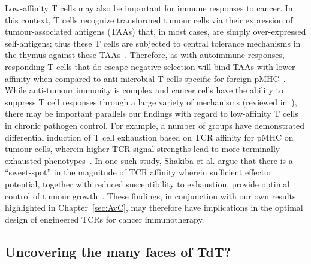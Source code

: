 Low-affinity T cells may also be important for immune responses to cancer. In this context, T cells recognize transformed tumour cells via their expression of tumour-associated antigens (TAAs) that, in most cases, are simply over-expressed self-antigens; thus these T cells are subjected to central tolerance mechanisms in the thymus against these TAAs~\cite{mcmahan2007mobilizing,martinez2018pd}. Therefore, as with autoimmune responses, responding T cells that do escape negative selection will bind TAAs with lower affinity when compared to anti-microbial T cells specific for foreign pMHC~\cite{mcmahan2007mobilizing}. While anti-tumour immunity is complex and cancer cells have the ability to suppress T cell responses through a large variety of mechanisms (reviewed in~\cite{kim2022evasion}), there may be important parallels our findings with regard to low-affinity T cells in chronic pathogen control. For example, a number of groups have demonstrated differential induction of T cell exhaustion based on TCR affinity for pMHC on tumour cells, wherein higher TCR signal strengths lead to more terminally exhausted phenotypes~\cite{martinez2018pd,shakiba2021tcr,hay2023low}. In one such study, Shakiba et al. argue that there is a ``sweet-spot'' in the magnitude of TCR affinity wherein sufficient effector potential, together with reduced susceptibility to exhaustion, provide optimal control of tumour growth~\cite{shakiba2021tcr}. These findings, in conjunction with our own results highlighted in Chapter~\ref{sec:AvC}, may therefore have implications in the optimal design of engineered TCRs for cancer immunotherapy.


\subsection{Uncovering the many faces of TdT?}

